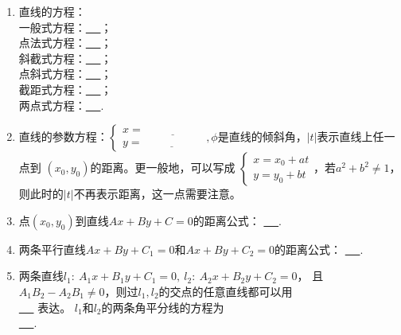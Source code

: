 \documentclass{article}
\newif\ifte
\begin{document}
\begin{multicols}{2}
\begin{enumerate}[leftmargin=20pt]
\item 直线的方程：\\
一般式方程：\underline{\ \ifte $ Ax+By+C=0 $\else \hspace{4cm} \fi\ }；\\
点法式方程：\underline{\ \ifte $ A(x-x_0)+B(y-y_0)=0 $
    \else \hspace{4cm} \fi\ }；\\
斜截式方程：\underline{\ \ifte $ y=kx+b $\else \hspace{4cm} \fi\ }；\\
点斜式方程：\underline{\ \ifte $ y-y_0=k(x-x_0) $
    \else \hspace{4cm} \fi\ }； \\
截距式方程：\underline{\ \ifte $ \dfrac{x}{a}+\dfrac{y}{b}=1 $
    \else \hspace{4cm} \fi\ }；\\
两点式方程：\underline{\ \ifte $ \dfrac{y-y_1}{x-x_1}=
    \dfrac{y_2-y_1}{x_2-x_1} $\else \hspace{4cm} \fi\ }.

\item 直线的参数方程：$ \left\{ \begin{aligned}
    x=\underline{\ \ifte x_0+t\cos \phi \else \hspace{2cm} \fi\ } \\
    y=\underline{\ \ifte y_0+t\sin \phi \else \hspace{2cm} \fi\ }
\end{aligned} \right. ,\phi $是直线的倾斜角，$ |t| $表示直线上任一点到
$ (x_0,y_0) $的距离。更一般地，可以写成
$ \left\{ \begin{aligned}
    x=x_0+at \\
    y=y_0+bt
\end{aligned} \right. $，若$ a^2+b^2\neq 1 $，
则此时的$ |t| $不再表示距离，这一点需要注意。

\item 点$ (x_0,y_0) $到直线$ Ax+By+C=0 $的距离公式：
\underline{\ \ifte $ \dfrac{|Ax_0+By_0+C|}{\sqrt{A^2+B^2}} $
    \else \hspace{2cm} \fi\ }.

\item 两条平行直线$ Ax+By+C_1=0 $和$ Ax+By+C_2=0 $的距离公式：
\underline{\ \ifte $ \dfrac{|C_1-C_2|}{\sqrt{A^2+B^2}} $
    \else \hspace{2cm} \fi\ }.

\item 两条直线$l_1:\ A_1x+B_1y+C_1=0,\ l_2:\ A_2x+B_2y+C_2=0 $，
且$ A_1B_2-A_2B_1\neq 0 $，则过$ l_1,l_2 $的交点的任意直线都可以用\\
\underline{\ \ifte $ \lambda(A_1x+B_1y+C_1)+\mu(A_2x+B_2y+C_2)=0 $
    \else \hspace{5cm} \fi\ }
表达。 $ l_1 $和$ l_2 $的两条角平分线的方程为 \\
\underline{\ \ifte $ \dfrac{A_1x+B_1y+C_1}{\sqrt{A_1^2+B_1^2}}=
    \pm\dfrac{A_2x+B_2y+C_2}{\sqrt{A_2^2+B_2^2}} $
    \else \hspace{4cm} \fi\ }.


\end{enumerate}
\end{multicols}
\end{document}
